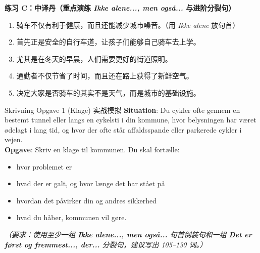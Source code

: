 \textbf{练习 C：中译丹（重点演练 \textit{Ikke alene..., men også...} 与进阶分裂句）}
\begin{enumerate}
  \item 骑车不仅有利于健康，而且还能减少城市噪音。（用 \textit{Ikke alene} 放句首）
  \item 首先正是安全的自行车道，让孩子们能够自己骑车去上学。
  \item 尤其是在冬天的早晨，人们需要更好的街道照明。
  \item 通勤者不仅节省了时间，而且还在路上获得了新鲜空气。
  \item 决定大家是否骑车的其实不是天气，而是城市的基础设施。
\end{enumerate}


\begin{emailbox}{Skrivning Opgave 1 (Klage) 实战模拟}
\textbf{Situation}: Du cykler ofte gennem en bestemt tunnel eller langs en cykelsti i din kommune, hvor belysningen har været ødelagt i lang tid, og hvor der ofte står affaldsspande eller parkerede cykler i vejen.\\
\textbf{Opgave}: Skriv en klage til kommunen. Du skal fortælle:
\begin{itemize}
  \item hvor problemet er
  \item hvad der er galt, og hvor længe det har stået på
  \item hvordan det påvirker din og andres sikkerhed
  \item hvad du håber, kommunen vil gøre.
\end{itemize}
\textit{（要求：使用至少一组 \textbf{Ikke alene..., men også...} 句首倒装句和一组 \textbf{Det er først og fremmest..., der...} 分裂句，建议写出 105--130 词。）}
\end{emailbox}

